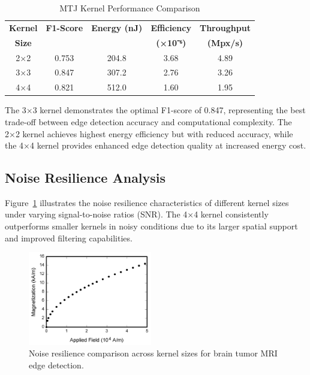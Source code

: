 \documentclass[conference]{IEEEtran}
\begin{document}
\begin{table}[htbp]
\caption{MTJ Kernel Performance Comparison}
\begin{center}
\begin{tabular}{|c|c|c|c|c|}
\hline
\textbf{Kernel} & \textbf{F1-Score} & \textbf{Energy (nJ)} & \textbf{Efficiency} & \textbf{Throughput} \\
\textbf{Size} & & & \textbf{(×10⁻⁶)} & \textbf{(Mpx/s)} \\
\hline
2×2 & 0.753 & 204.8 & 3.68 & 4.89 \\
\hline
3×3 & 0.847 & 307.2 & 2.76 & 3.26 \\
\hline
4×4 & 0.821 & 512.0 & 1.60 & 1.95 \\
\hline
\end{tabular}
\label{tab:kernel_comparison}
\end{center}
\end{table}

The 3×3 kernel demonstrates the optimal F1-score of 0.847, representing the best trade-off between edge detection accuracy and computational complexity. The 2×2 kernel achieves highest energy efficiency but with reduced accuracy, while the 4×4 kernel provides enhanced edge detection quality at increased energy cost.

\subsection{Noise Resilience Analysis}

Figure~\ref{fig:noise_analysis} illustrates the noise resilience characteristics of different kernel sizes under varying signal-to-noise ratios (SNR). The 4×4 kernel consistently outperforms smaller kernels in noisy conditions due to its larger spatial support and improved filtering capabilities.

\begin{figure}[htbp]
\centerline{\includegraphics[width=0.48\textwidth]{fig1.png}}
\caption{Noise resilience comparison across kernel sizes for brain tumor MRI edge detection.}
\label{fig:noise_analysis}
\end{figure}
\end{document}
